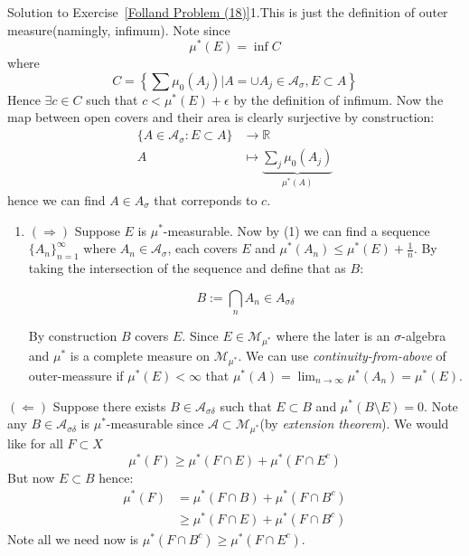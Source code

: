 \begin{mystsolution}{Solution to Exercise~\ref{Folland Problem (18)}}1.This is just the definition of outer measure(namingly, infimum). Note since
\begin{equation}
\mu^*(E)= \inf C
\end{equation}
where
\begin{equation}
C= \left\{\sum \mu_0(A_j) | A=\cup A_j\in \mathcal A_{\sigma}, E\subset A \right\}
\end{equation}
Hence $\exists c\in C$ such that $c < \mu^*(E)+\epsilon$ by the definition of infimum. Now the map between open covers and their area is clearly surjective by construction:
\begin{equation}
\begin{aligned}
\{A\in \mathcal A_{\sigma} : E\subset A\} &\to \mathbb{R} \\
A &\mapsto \underbrace{\sum_j \mu_0(A_j)}_{\mu^*(A)}
\end{aligned}
\end{equation}
hence we can find $A\in A_{\sigma}$ that correponds to $c$.

\begin{enumerate}[resume]
\item $(\Longrightarrow)$ Suppose $E$ is $\mu^*$-measurable. Now by (1) we can find a sequence $\{A_n\}_{n=1}^{\infty}$ where $A_n\in \mathcal A_{\sigma}$, each covers $E$ and $\mu^*(A_n)\leq \mu^*(E)+\frac1n$.  By taking the intersection of the sequence and define that as $B$:

\begin{equation}
B:=\bigcap_{n}A_{n} \in A_{\sigma \delta}
\end{equation}


By construction $B$ covers $E$. Since $E\in \mathcal M_{\mu^*}$ where the later is an $\sigma$-algebra and $\mu^*$ is a complete measure on $\mathcal{M}_{\mu^*}$. We can use \textit{continuity-from-above} of outer-meassure if $\mu^*(E)<\infty$ that $\mu^*(A)=\lim_{n \to \infty}\mu^*(A_n)=\mu^*(E)$.
\end{enumerate}

$(\Longleftarrow)$ Suppose there exists $B\in \mathcal A_{\sigma \delta}$ such that $E\subset B$ and $\mu^*(B\setminus E)=0$. Note any $B\in \mathcal A_{\sigma \delta}$ is $\mu^*$-measurable since $\mathcal A \subset \mathcal M_{\mu^*}$(by \textit{extension theorem}).
We would like for all $F\subset X$
\begin{equation}
\mu^*(F) \geq  \mu^*(F\cap E) +\mu^*(F \cap E^c)
\end{equation}
But now $E\subset B$ hence:
\begin{equation}
\begin{aligned}
\mu^*(F) &= \mu^*(F\cap B) + \mu^*(F\cap B^c) \\ 
&\geq  \mu^*(F\cap E) + \mu^*(F\cap B^c)
\end{aligned}
\end{equation}
Note all we need now is $\mu^*(F \cap B^c) \geq  \mu^*(F\cap E^c)$.


\end{mystsolution}
